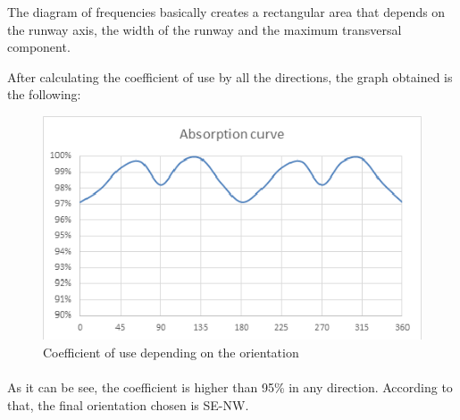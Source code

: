 		The diagram of frequencies basically creates a rectangular area that depends on the runway
		axis, the width of the runway and the maximum transversal component.
		
		After calculating the coefficient of use by all the directions, the graph obtained is the following:

		\begin{figure}[H]
			\centering
			\includegraphics[clip, trim=0cm 0cm 0cm 0cm, width=1\textwidth]{./images/WIND/GRAPH}
			\caption{Coefficient of use depending on the orientation} %
			\label{} %
		\end{figure}
		
		\paragraph{}As it can be see, the coefficient is higher than 95\% in any direction. According to that, the final
		orientation chosen is SE-NW.